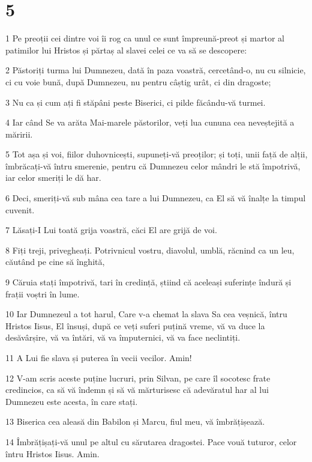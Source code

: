 \chapter{5}

\par 1 Pe preoții cei dintre voi îi rog ca unul ce sunt împreună-preot și martor al patimilor lui Hristos și părtaș al slavei celei ce va să se descopere:
\par 2 Păstoriți turma lui Dumnezeu, dată în paza voastră, cercetând-o, nu cu silnicie, ci cu voie bună, după Dumnezeu, nu pentru câștig urât, ci din dragoste;
\par 3 Nu ca și cum ați fi stăpâni peste Biserici, ci pilde făcându-vă turmei.
\par 4 Iar când Se va arăta Mai-marele păstorilor, veți lua cununa cea neveștejită a măririi.
\par 5 Tot așa și voi, fiilor duhovnicești, supuneți-vă preoților; și toți, unii față de alții, îmbrăcați-vă întru smerenie, pentru că Dumnezeu celor mândri le stă împotrivă, iar celor smeriți le dă har.
\par 6 Deci, smeriți-vă sub mâna cea tare a lui Dumnezeu, ca El să vă înalțe la timpul cuvenit.
\par 7 Lăsați-I Lui toată grija voastră, căci El are grijă de voi.
\par 8 Fiți treji, privegheați. Potrivnicul vostru, diavolul, umblă, răcnind ca un leu, căutând pe cine să înghită,
\par 9 Căruia stați împotrivă, tari în credință, știind că aceleași suferințe îndură și frații voștri în lume.
\par 10 Iar Dumnezeul a tot harul, Care v-a chemat la slava Sa cea veșnică, întru Hristos Iisus, El însuși, după ce veți suferi puțină vreme, vă va duce la desăvârșire, vă va întări, vă va împuternici, vă va face neclintiți.
\par 11 A Lui fie slava și puterea în vecii vecilor. Amin!
\par 12 V-am scris aceste puține lucruri, prin Silvan, pe care îl socotesc frate credincios, ca să vă îndemn și să vă mărturisesc că adevăratul har al lui Dumnezeu este acesta, în care stați.
\par 13 Biserica cea aleasă din Babilon și Marcu, fiul meu, vă îmbrățișează.
\par 14 Îmbrățișați-vă unul pe altul cu sărutarea dragostei. Pace vouă tuturor, celor întru Hristos Iisus. Amin.


